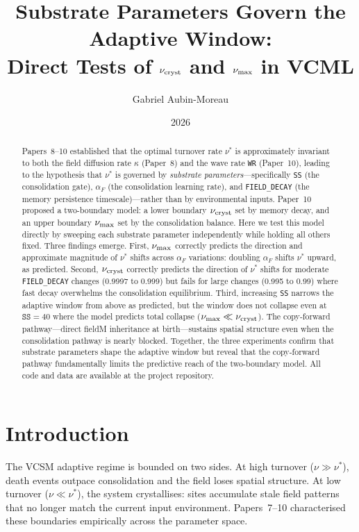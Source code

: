 \documentclass[11pt]{article}
\title{%
  Substrate Parameters Govern the Adaptive Window:\\
  Direct Tests of $\nu_{\rm cryst}$ and $\nu_{\rm max}$ in VCML%
}
\author{Gabriel Aubin-Moreau}
\date{2026}
\begin{document}
\maketitle

\begin{abstract}
Papers~8--10 established that the optimal turnover rate $\nu^*$ is approximately
invariant to both the field diffusion rate $\kappa$ (Paper~8) and the wave rate
\texttt{WR} (Paper~10), leading to the hypothesis that $\nu^*$ is governed by
\emph{substrate parameters}---specifically \texttt{SS} (the consolidation gate),
$\alpha_F$ (the consolidation learning rate), and \texttt{FIELD\_DECAY}
(the memory persistence timescale)---rather than by environmental inputs.
Paper~10 proposed a two-boundary model:
a lower boundary $\nu_{\rm cryst}$ set by memory decay, and an upper boundary
$\nu_{\rm max}$ set by the consolidation balance.
Here we test this model directly by sweeping each substrate parameter independently
while holding all others fixed.
Three findings emerge.
First, $\nu_{\rm max}$ correctly predicts the direction and approximate magnitude
of $\nu^*$ shifts across $\alpha_F$ variations: doubling $\alpha_F$ shifts
$\nu^*$ upward, as predicted.
Second, $\nu_{\rm cryst}$ correctly predicts the direction of $\nu^*$ shifts
for moderate \texttt{FIELD\_DECAY} changes (0.9997 to 0.999) but fails for
large changes (0.995 to 0.99) where fast decay overwhelms the consolidation
equilibrium.
Third, increasing \texttt{SS} narrows the adaptive window from above as predicted,
but the window does not collapse even at $\texttt{SS}=40$ where the model
predicts total collapse ($\nu_{\rm max} \ll \nu_{\rm cryst}$).
The copy-forward pathway---direct fieldM inheritance at birth---sustains spatial
structure even when the consolidation pathway is nearly blocked.
Together, the three experiments confirm that substrate parameters shape the adaptive
window but reveal that the copy-forward pathway fundamentally limits the predictive
reach of the two-boundary model.
All code and data are available at the project repository.
\end{abstract}

\section{Introduction}

The VCSM adaptive regime is bounded on two sides.
At high turnover ($\nu \gg \nu^*$), death events outpace consolidation and the
field loses spatial structure.
At low turnover ($\nu \ll \nu^*$), the system crystallises: sites accumulate stale
field patterns that no longer match the current input environment.
Papers~7--10 characterised these boundaries empirically across the parameter space.
\end{document}
